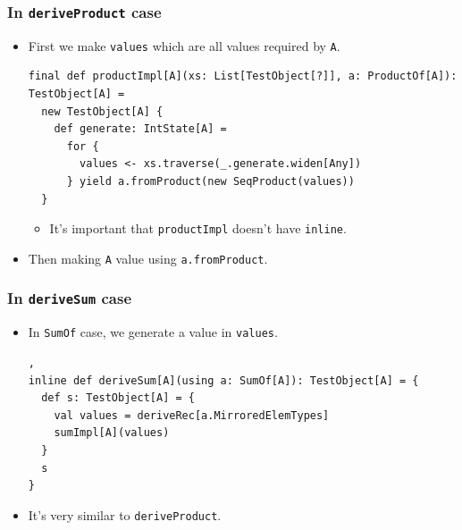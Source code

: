 \begin{frame}[fragile]
  \frametitle{ In \lstinline|deriveProduct| case}

  \begin{itemize}
    \item First we make \lstinline|values| which are all values 
    required by \lstinline|A|.
\begin{lstlisting}[style=scala]
final def productImpl[A](xs: List[TestObject[?]], a: ProductOf[A]): TestObject[A] =
  new TestObject[A] {
    def generate: IntState[A] =
      for {
        values <- xs.traverse(_.generate.widen[Any])
      } yield a.fromProduct(new SeqProduct(values))
  }
\end{lstlisting}
    \begin{itemize}
      \item It's important that \lstinline|productImpl| doesn't have \lstinline|inline|.
    \end{itemize}

    \item Then making \lstinline|A| value using \lstinline|a.fromProduct|.
  \end{itemize}

\end{frame}

\begin{frame}[fragile]
  \frametitle{ In \lstinline|deriveSum| case}

  \begin{itemize}
    \item In \lstinline|SumOf| case, we generate a value in \lstinline|values|.
\begin{lstlisting}[style=scala],
inline def deriveSum[A](using a: SumOf[A]): TestObject[A] = {
  def s: TestObject[A] = {
    val values = deriveRec[a.MirroredElemTypes]
    sumImpl[A](values)
  }
  s
}
\end{lstlisting}
    \item It's very similar to \lstinline|deriveProduct|.
  \end{itemize}

\end{frame}

